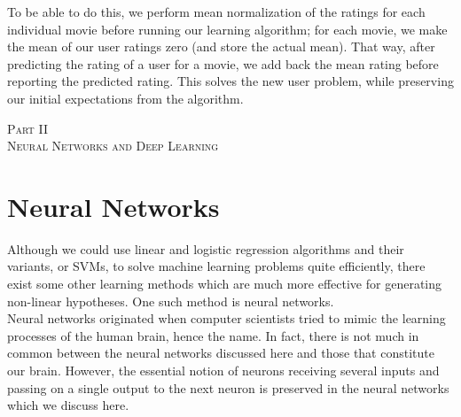 \documentclass[a4paper, 12pt]{report}
\begin{document}
\break
To be able to do this, we perform mean normalization of the ratings for each individual movie before running our learning algorithm; for each movie, we make the mean of our user ratings zero (and store the actual mean). That way, after predicting the rating of a user for a movie, we add back the mean rating before reporting the predicted rating. This solves the new user problem, while preserving our initial expectations from the algorithm.

\newpage

\vspace*{\fill}
\begin{center}
{\huge\scshape Part II \\\vspace{1cm} Neural Networks and Deep Learning}
\end{center}
\vspace*{\fill}

\newpage


\chapter{Neural Networks}
Although we could use linear and logistic regression algorithms and their variants, or SVMs, to solve machine learning problems quite efficiently, there exist some other learning methods which are much more effective for generating non-linear hypotheses. One such method is neural networks. \\
\break
Neural networks originated when computer scientists tried to mimic the learning processes of the human brain, hence the name. In fact, there is not much in common between the neural networks discussed here and those that constitute our brain. However, the essential notion of neurons receiving several inputs and passing on a single output to the next neuron is preserved in the neural networks which we discuss here.
\end{document}
